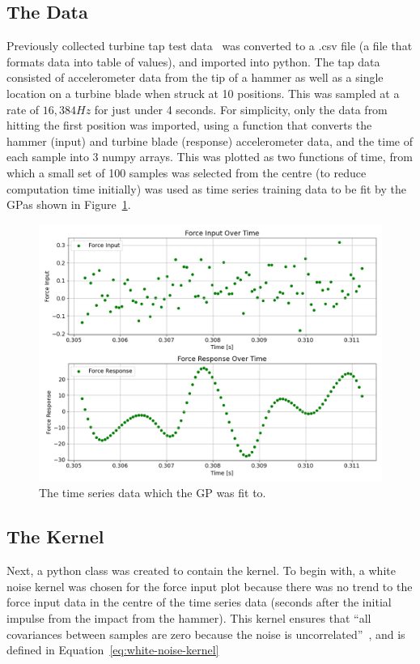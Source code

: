 \documentclass[12pt]{article}
\begin{document}
    \subsection{The Data}
    Previously collected turbine tap test data~\cite{MEC326} was converted to a .csv file (a file that formats data into table of values), and imported into python.
    The tap data consisted of accelerometer data from the tip of a hammer as well as a single location on a turbine blade when struck at 10 positions.
    This was sampled at a rate of $16,384 Hz$ for just under 4 seconds.
    For simplicity, only the data from hitting the first position was imported, using a function that converts the hammer (input) and turbine blade (response) accelerometer data, and the time of each sample into 3 numpy arrays.
    This was plotted as two functions of time, from which a small set of 100 samples was selected from the centre (to reduce computation time initially) was used as time series training data to be fit by the GP\@ as shown in Figure~\ref{fig:input-response-plot}.

    \begin{figure}[ht]
        \centering
        \includegraphics[width=1.0\linewidth]{figures/input-response-plot/input-response-plot.png}
        \caption{The time series data which the GP was fit to.}
        \label{fig:input-response-plot}
    \end{figure}



    \subsection{The Kernel}
    Next, a python class was created to contain the kernel.
    To begin with, a white noise kernel was chosen for the force input plot because there was no trend to the force input data in the centre of the time series data (seconds after the initial impulse from the impact from the hammer).
    This kernel ensures that ``all covariances between samples are zero because the noise is uncorrelated''~\cite{RoelantsGPKernels}, and is defined in Equation~\ref{eq:white-noise-kernel}
\end{document}
